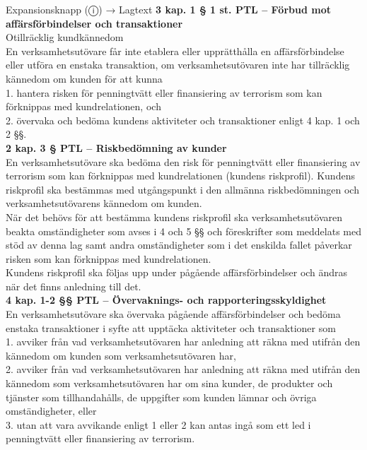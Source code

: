 \documentclass[10pt]{beamer}
\begin{document}
\begin{frame}[label=riskfragor-steg1]
\begin{alertblock}{Expansionsknapp (ⓘ) → Lagtext}
    \tiny \textbf{3 kap. 1 § 1 st. PTL – Förbud mot affärsförbindelser och transaktioner}\\
    \tiny Otillräcklig kundkännedom\\

    \tiny En verksamhetsutövare får inte etablera eller upprätthålla en affärsförbindelse 
    eller utföra en enstaka transaktion, om verksamhetsutövaren inte har tillräcklig kännedom 
    om kunden för att kunna\\
    \tiny 1. hantera risken för penningtvätt eller finansiering av terrorism som kan förknippas med 
    kundrelationen, och\\
    \tiny 2. övervaka och bedöma kundens aktiviteter och transaktioner enligt 4 kap. 1 och 2 §§.\\[0.1cm]


    \tiny \textbf{2 kap. 3 § PTL – Riskbedömning av kunder}\\
    \tiny  En verksamhetsutövare ska bedöma den risk för penningtvätt eller finansiering av 
    terrorism som kan förknippas med kundrelationen (kundens riskprofil). Kundens riskprofil ska 
    bestämmas med utgångspunkt i den allmänna riskbedömningen och verksamhetsutövarens kännedom om kunden.\\

    \tiny När det behövs för att bestämma kundens riskprofil ska verksamhetsutövaren beakta omständigheter 
    som avses i 4 och 5 §§ och föreskrifter som meddelats med stöd av denna lag samt andra omständigheter 
    som i det enskilda fallet påverkar risken som kan förknippas med kundrelationen.\\

    \tiny Kundens riskprofil ska följas upp under pågående affärsförbindelser och ändras när det finns 
    anledning till det.\\[0.1cm]
    

    \tiny \textbf{4 kap. 1-2 §§ PTL – Övervaknings- och rapporteringsskyldighet}\\
    \tiny En verksamhetsutövare ska övervaka pågående affärsförbindelser och bedöma enstaka 
    transaktioner i syfte att upptäcka aktiviteter och transaktioner som\\
    \tiny 1. avviker från vad verksamhetsutövaren har anledning att räkna med utifrån den kännedom om 
    kunden som verksamhetsutövaren har,\\
    \tiny 2. avviker från vad verksamhetsutövaren har anledning att räkna med utifrån den kännedom 
    som verksamhetsutövaren har om sina kunder, de produkter och tjänster som tillhandahålls, 
    de uppgifter som kunden lämnar och övriga omständigheter, eller\\
    \tiny 3. utan att vara avvikande enligt 1 eller 2 kan antas ingå som ett led i penningtvätt 
    eller finansiering av terrorism.\\


\end{alertblock}
\end{frame}
\end{document}
